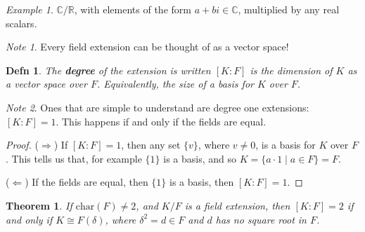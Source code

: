 \documentclass[12pt]{article}
\def\char{\text{char}}
\def\R{{\mathbb R}}
\def\C{{\mathbb C}}
\newtheorem{theorem}{Theorem}
\newtheorem{definition}{Defn}
\theoremstyle{remark}
\theoremstyle{remark}
\theoremstyle{remark}
\newtheorem{example}{Example}
\theoremstyle{remark}
\theoremstyle{remark}
\newtheorem*{note}{Note}
\begin{document}
\begin{example}
  $\C / \R$, with elements of the form $a + bi \in \C$, multiplied by any real
  scalars.
\end{example}

\begin{note}
  Every field extension can be thought of as a vector space!
\end{note}

\begin{definition}
  The {\bf degree} of the extension is written $[K : F]$ is the dimension of $K$
  as a vector space over $F$. Equivalently, the size of a basis for $K$ over
  $F$.
\end{definition}

\begin{note}
  Ones that are simple to understand are degree one extensions: $[K : F] = 1$.
  This happens if and only if the fields are equal.
\end{note}

\begin{proof}
  ($\Rightarrow$) If $[K : F] = 1$, then any set $\{v\}$, where $v \ne 0$, is
  a basis for $K$ over $F$. This tells us that, for example $\{1\}$ is a basis,
  and so $K = \{ a \cdot 1 \mid a \in F \} = F$.

  ($\Leftarrow$) If the fields are equal, then $\{1\}$ is a basis, then $[K : F]
  = 1$.
\end{proof}

\begin{theorem}
  If $\char(F) \ne 2$, and $K / F$ is a field extension, then $[K : F] = 2$ if
  and only if $K \cong F(\delta)$, where $\delta^2 = d \in F$ and $d$ has no
  square root in $F$.
\end{theorem}
\end{document}
